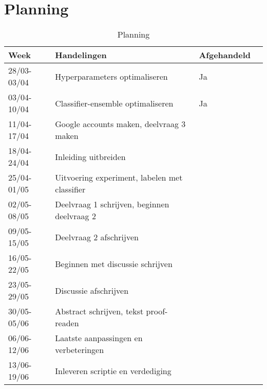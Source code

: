 \documentclass[../main.tex]{subfiles}
\begin{document}
\section{Planning}

\begin{table}[!b]
\centering
\caption{Planning}
\label{tab:planning}
\begin{tabular}{@{}ll@{}ll@{}}
\toprule
Week        & Handelingen                                                     & Afgehandeld \\ \midrule
28/03-03/04 & Hyperparameters optimaliseren                                   &     Ja      \\
03/04-10/04 & Classifier-ensemble optimaliseren                               &     Ja      \\
11/04-17/04 & Google accounts maken, deelvraag 3 maken                        &             \\
18/04-24/04 & Inleiding uitbreiden                                            &             \\
25/04-01/05 & Uitvoering experiment, labelen met classifier                   &             \\
02/05-08/05 & Deelvraag 1 schrijven, beginnen deelvraag 2                     &             \\
09/05-15/05 & Deelvraag 2 afschrijven                                         &             \\
16/05-22/05 & Beginnen met discussie schrijven                                &             \\
23/05-29/05 & Discussie afschrijven                                           &             \\
30/05-05/06 & Abstract schrijven, tekst proof-readen                          &             \\
06/06-12/06 & Laatste aanpassingen en verbeteringen                           &             \\
13/06-19/06 & Inleveren scriptie en verdediging                               &             \\ \bottomrule
\end{tabular}

\end{table}
\end{document}
